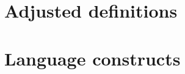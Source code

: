 \section{Adjusted definitions}
\label{sec:Coverage for further program classes/Adjusted definitions}

\section{Language constructs}
\label{sec:Coverage for further program classes/Language constructs}

